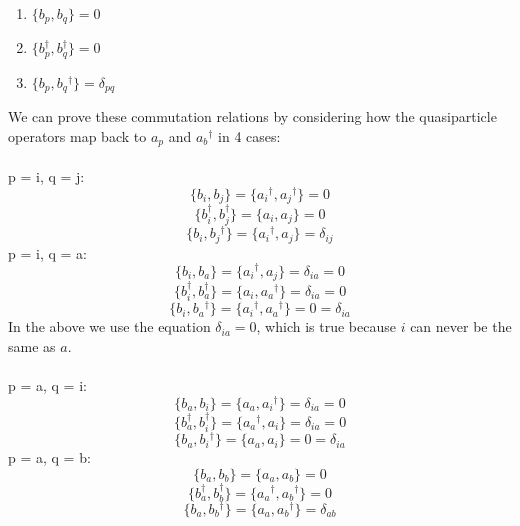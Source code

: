 \documentclass{article}
\newcommand{\dg}{\ensuremath{^\dagger} }
\begin{document}
\begin{enumerate}
\item  $\{b_p, b_q\} = 0$
\item $\{b_p^\dagger, b_q^\dagger \} = 0$
\item $\{b_p, b_q\dg \} = \delta_{pq}$
\end{enumerate}
We can prove these commutation relations by considering how the quasiparticle operators map back to $a_p$ and $a_b\dg$ in 4 cases:
\\ \\
p = i, q = j: 
\[ \{b_i, b_j\} =  \{a_i\dg, a_j\dg\} = 0 \]
\[ \{b_i^\dagger, b_j^\dagger \}  = \{a_i, a_j \} = 0 \]
\[ \{b_i, b_j\dg \} =  \{a_i\dg, a_j \} = \delta_{ij} \]
p = i, q = a: 
\[ \{b_i, b_a\} =  \{a_i\dg, a_j\} = \delta_{ia} = 0 \]
\[ \{b_i^\dagger, b_a^\dagger \}  = \{a_i, a_a\dg \}  =  \delta_{ia} = 0 \]
\[ \{b_i, b_a\dg \} =  \{a_i\dg, a_a\dg \} = 0 = \delta_{ia} \]
In the above we use the equation $\delta_{ia} = 0$, which is true because $i$ can never be the same as $a$. 
\\ \\ 
p = a, q = i: 
\[ \{b_a, b_i\} =  \{a_a, a_i\dg\} =  \delta_{ia} = 0 \]
\[ \{b_a^\dagger, b_i^\dagger \}  = \{a_a\dg, a_i \} =  \delta_{ia} = 0 \]
\[ \{b_a, b_i\dg \} =  \{a_a, a_i \} =  0 = \delta_{ia}  \]
p = a, q = b: 
\[ \{b_a, b_b\} =  \{a_a, a_b\}  = 0 \]
\[ \{b_a^\dagger, b_b^\dagger \}  = \{a_a\dg, a_b\dg \} = 0 \]
\[ \{b_a, b_b\dg \} =  \{a_a, a_b\dg\}  = \delta_{ab}  \]
\end{document}
